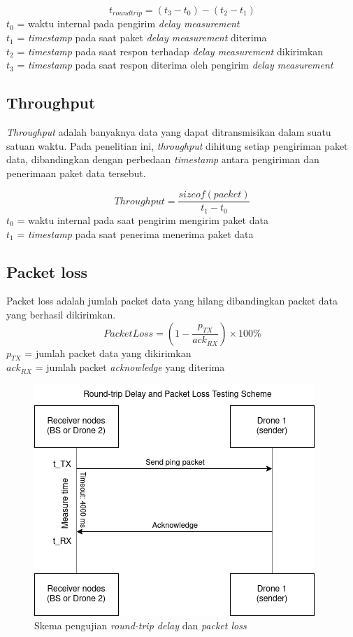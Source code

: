\[ t_{round trip} = (t_3 - t_0) - (t_2 - t_1) \]
$t_0$ = waktu internal pada pengirim \textit{delay measurement}\\
$t_1$ = \textit{timestamp} pada saat paket \textit{delay measurement} diterima\\
$t_2$ = \textit{timestamp} pada saat respon terhadap \textit{delay measurement} dikirimkan\\
$t_3$ = \textit{timestamp} pada saat respon diterima oleh pengirim \textit{delay measurement}

\subsection{Throughput}
\textit{Throughput} adalah banyaknya data yang dapat ditransmisikan dalam suatu satuan waktu. Pada penelitian ini, \textit{throughput} dihitung setiap pengiriman paket data, dibandingkan dengan perbedaan \textit{timestamp} antara pengiriman dan penerimaan paket data tersebut.

\[Throughput = \frac{sizeof(packet)}{t_1 - t_0}\]
$t_0$ = waktu internal pada saat pengirim mengirim paket data\\
$t_1$ = \textit{timestamp} pada saat penerima menerima paket data

\subsection{Packet loss}
Packet loss adalah jumlah packet data yang hilang dibandingkan packet data yang berhasil dikirimkan.
\[ Packet Loss = (1 - \frac{p_{TX}}{ack_{RX}})\times 100\%\]
$p_{TX}$ = jumlah packet data yang dikirimkan\\
$ack_{RX}$ = jumlah packet \textit{acknowledge} yang diterima

\begin{figure}[H]
	\centering
	\includegraphics[scale=0.7]{./assets/PingTest}
	\caption{Skema pengujian \textit{round-trip delay} dan \textit{packet loss}}
\end{figure}